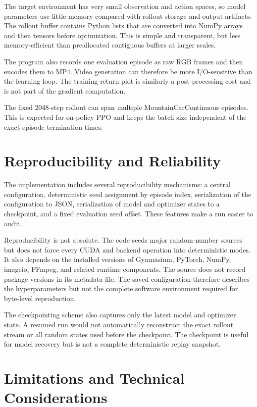 \documentclass[11pt,a4paper]{article}
\begin{document}
The target environment has very small observation and action spaces, so model parameters use little memory compared with rollout storage and output artifacts. The rollout buffer contains Python lists that are converted into NumPy arrays and then tensors before optimization. This is simple and transparent, but less memory-efficient than preallocated contiguous buffers at larger scales.

The program also records one evaluation episode as raw RGB frames and then encodes them to MP4. Video generation can therefore be more I/O-sensitive than the learning loop. The training-return plot is similarly a post-processing cost and is not part of the gradient computation.

The fixed 2048-step rollout can span multiple MountainCarContinuous episodes. This is expected for on-policy PPO and keeps the batch size independent of the exact episode termination times.

\section{Reproducibility and Reliability}
The implementation includes several reproducibility mechanisms: a central configuration, deterministic seed assignment by episode index, serialization of the configuration to JSON, serialization of model and optimizer states to a checkpoint, and a fixed evaluation seed offset. These features make a run easier to audit.

Reproducibility is not absolute. The code seeds major random-number sources but does not force every CUDA and backend operation into deterministic modes. It also depends on the installed versions of Gymnasium, PyTorch, NumPy, imageio, FFmpeg, and related runtime components. The source does not record package versions in its metadata file. The saved configuration therefore describes the hyperparameters but not the complete software environment required for byte-level reproduction.

The checkpointing scheme also captures only the latest model and optimizer state. A resumed run would not automatically reconstruct the exact rollout stream or all random states used before the checkpoint. The checkpoint is useful for model recovery but is not a complete deterministic replay snapshot.

\section{Limitations and Technical Considerations}
\end{document}
